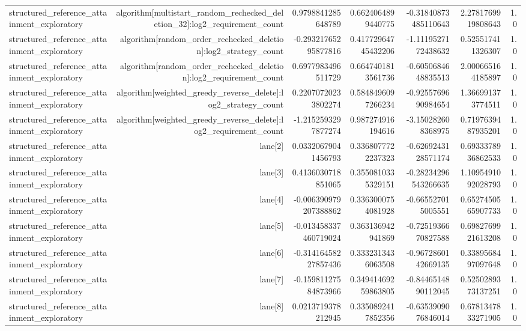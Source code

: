 {\begin{longtable}{lrrrrrr}
structured\_reference\_attainment\_exploratory & algorithm[multistart\_random\_rechecked\_deletion\_32]:log2\_requirement\_count & 0.9798841285648789 & 0.6624064899440775 & -0.31840873485110643 & 2.2781769919808643 & 1.0 \\
structured\_reference\_attainment\_exploratory & algorithm[random\_order\_rechecked\_deletion]:log2\_strategy\_count & -0.29321765295877816 & 0.41772964745432206 & -1.1119527172438632 & 0.525517411326307 & 1.0 \\
structured\_reference\_attainment\_exploratory & algorithm[random\_order\_rechecked\_deletion]:log2\_requirement\_count & 0.6977983496511729 & 0.6647401813561736 & -0.6050684648835513 & 2.000665164185897 & 1.0 \\
structured\_reference\_attainment\_exploratory & algorithm[weighted\_greedy\_reverse\_delete]:log2\_strategy\_count & 0.22070720233802274 & 0.5848496097266234 & -0.9255769690984654 & 1.366991373774511 & 1.0 \\
structured\_reference\_attainment\_exploratory & algorithm[weighted\_greedy\_reverse\_delete]:log2\_requirement\_count & -1.2152593297877274 & 0.987274916194616 & -3.150282608368975 & 0.7197639487935201 & 1.0 \\
structured\_reference\_attainment\_exploratory & lane[2] & 0.03320679041456793 & 0.3368077722237323 & -0.6269243128571174 & 0.6933378936862533 & 1.0 \\
structured\_reference\_attainment\_exploratory & lane[3] & 0.4136030718851065 & 0.3550810335329151 & -0.28234296543266635 & 1.1095491092028793 & 1.0 \\
structured\_reference\_attainment\_exploratory & lane[4] & -0.006390979207388862 & 0.3363000754081928 & -0.665527015005551 & 0.6527450565907733 & 1.0 \\
structured\_reference\_attainment\_exploratory & lane[5] & -0.013458337460719024 & 0.363136942941869 & -0.7251936670827588 & 0.6982769921613208 & 1.0 \\
structured\_reference\_attainment\_exploratory & lane[6] & -0.31416458227857436 & 0.3332313436063508 & -0.9672860142669135 & 0.3389568497097648 & 1.0 \\
structured\_reference\_attainment\_exploratory & lane[7] & -0.15981127584873966 & 0.34941469259863805 & -0.8446514890112045 & 0.5250289373137251 & 1.0 \\
structured\_reference\_attainment\_exploratory & lane[8] & 0.0213719378212945 & 0.3350892417852356 & -0.6353909076846014 & 0.6781347833271905 & 1.0 \\
\bottomrule
\end{longtable}
}
